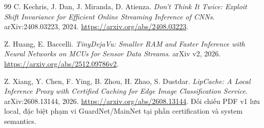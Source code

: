 \documentclass[11pt,a4paper]{article}
\theoremstyle{remark}
\begin{document}
\begin{thebibliography}{99}
 C. Kechris, J. Dan, J. Miranda, D. Atienza.
\emph{Don't Think It Twice: Exploit Shift Invariance for Efficient Online
Streaming Inference of CNNs}. arXiv:2408.03223, 2024.
\url{https://arxiv.org/abs/2408.03223}.

 Z. Huang, E. Baccelli.
\emph{TinyDejaVu: Smaller RAM and Faster Inference with Neural Networks on
MCUs for Sensor Data Streams}. arXiv v2, 2026.
\url{https://arxiv.org/abs/2512.09786v2}.

 Z. Xiang, Y. Chen, F. Ying, B. Zhou, H. Zhao, S. Dustdar.
\emph{LipCache: A Local Inference Proxy with Certified Caching for Edge
Image Classification Service}. arXiv:2608.13144, 2026.
\url{https://arxiv.org/abs/2608.13144}. Đối chiếu PDF v1 lưu local,
đặc biệt phạm vi GuardNet/MainNet tại phần certification và system semantics.
\end{thebibliography}
\end{document}
